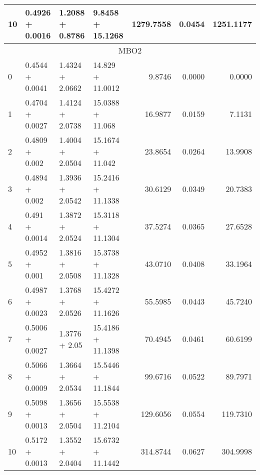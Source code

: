 \begin{tabular}{llllrrr}
  10 &  0.4926 + 0.0016 &  1.2088 + 0.8786 &  9.8458 + 15.1268 &           1279.7558 &                 0.0454 &      1251.1177 \\
  \midrule
  \multicolumn{7}{c}{MBO2} \\
  \midrule
  0  &  0.4544 + 0.0041 &  1.4324 + 2.0662 &   14.829 + 11.0012 &              9.8746 &                 0.0000 &         0.0000 \\
  1  &  0.4704 + 0.0027 &  1.4124 + 2.0738 &   15.0388 + 11.068 &             16.9877 &                 0.0159 &         7.1131 \\
  2  &   0.4809 + 0.002 &  1.4004 + 2.0504 &   15.1674 + 11.042 &             23.8654 &                 0.0264 &        13.9908 \\
  3  &   0.4894 + 0.002 &  1.3936 + 2.0542 &  15.2416 + 11.1338 &             30.6129 &                 0.0349 &        20.7383 \\
  4  &   0.491 + 0.0014 &  1.3872 + 2.0524 &  15.3118 + 11.1304 &             37.5274 &                 0.0365 &        27.6528 \\
  5  &   0.4952 + 0.001 &  1.3816 + 2.0508 &  15.3738 + 11.1328 &             43.0710 &                 0.0408 &        33.1964 \\
  6  &  0.4987 + 0.0023 &  1.3768 + 2.0526 &  15.4272 + 11.1626 &             55.5985 &                 0.0443 &        45.7240 \\
  7  &  0.5006 + 0.0027 &    1.3776 + 2.05 &  15.4186 + 11.1398 &             70.4945 &                 0.0461 &        60.6199 \\
  8  &  0.5066 + 0.0009 &  1.3664 + 2.0534 &  15.5446 + 11.1844 &             99.6716 &                 0.0522 &        89.7971 \\
  9  &  0.5098 + 0.0013 &  1.3656 + 2.0504 &  15.5538 + 11.2104 &            129.6056 &                 0.0554 &       119.7310 \\
  10 &  0.5172 + 0.0013 &  1.3552 + 2.0404 &  15.6732 + 11.1442 &            314.8744 &                 0.0627 &       304.9998 \\
  \bottomrule
  \end{tabular}
  